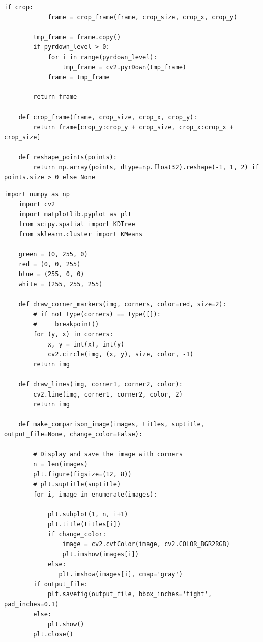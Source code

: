 \documentclass[11pt, conference, letterpaper]{IEEEtran}
\begin{document}
\begin{lstlisting}[style=python, caption={\texttt{video\_utils.py}}, label={lst:vutils}]
        if crop:
            frame = crop_frame(frame, crop_size, crop_x, crop_y)
         
        tmp_frame = frame.copy()
        if pyrdown_level > 0:
            for i in range(pyrdown_level):
                tmp_frame = cv2.pyrDown(tmp_frame)
            frame = tmp_frame
    
        return frame
        
    def crop_frame(frame, crop_size, crop_x, crop_y):
        return frame[crop_y:crop_y + crop_size, crop_x:crop_x + crop_size]
    
    def reshape_points(points):
        return np.array(points, dtype=np.float32).reshape(-1, 1, 2) if points.size > 0 else None
\end{lstlisting}

\begin{lstlisting}[style=python, caption={\texttt{plot\_utils.py}}, label={lst:putils}]
    import numpy as np
    import cv2
    import matplotlib.pyplot as plt
    from scipy.spatial import KDTree
    from sklearn.cluster import KMeans
    
    green = (0, 255, 0)
    red = (0, 0, 255)
    blue = (255, 0, 0)
    white = (255, 255, 255)
    
    def draw_corner_markers(img, corners, color=red, size=2):
        # if not type(corners) == type([]):
        #     breakpoint()
        for (y, x) in corners:
            x, y = int(x), int(y)
            cv2.circle(img, (x, y), size, color, -1)
        return img
    
    def draw_lines(img, corner1, corner2, color):
        cv2.line(img, corner1, corner2, color, 2)
        return img
    
    def make_comparison_image(images, titles, suptitle, output_file=None, change_color=False):
        
        # Display and save the image with corners
        n = len(images)
        plt.figure(figsize=(12, 8))
        # plt.suptitle(suptitle)
        for i, image in enumerate(images):
    
            plt.subplot(1, n, i+1)
            plt.title(titles[i])
            if change_color:
                image = cv2.cvtColor(image, cv2.COLOR_BGR2RGB)
                plt.imshow(images[i])
            else:
               plt.imshow(images[i], cmap='gray') 
        if output_file:
            plt.savefig(output_file, bbox_inches='tight', pad_inches=0.1)
        else:
            plt.show()
        plt.close() 
            

\end{lstlisting}
\end{document}
